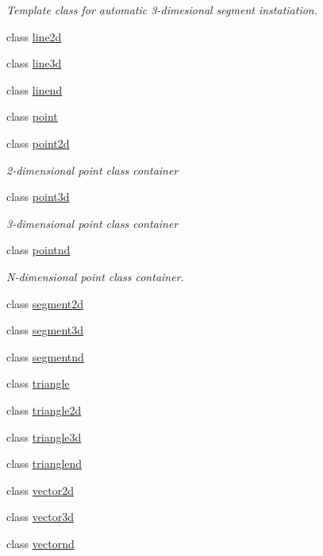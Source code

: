 \begin{DoxyCompactItemize}
\begin{DoxyCompactList}\small\item\em Template class for automatic 3-\/dimesional segment instatiation. \end{DoxyCompactList}\item 
class \hyperlink{classacme_1_1line2d}{line2d}
\item 
class \hyperlink{classacme_1_1line3d}{line3d}
\item 
class \hyperlink{classacme_1_1linend}{linend}
\item 
class \hyperlink{classacme_1_1point}{point}
\item 
class \hyperlink{classacme_1_1point2d}{point2d}
\begin{DoxyCompactList}\small\item\em 2-\/dimensional point class container \end{DoxyCompactList}\item 
class \hyperlink{classacme_1_1point3d}{point3d}
\begin{DoxyCompactList}\small\item\em 3-\/dimensional point class container \end{DoxyCompactList}\item 
class \hyperlink{classacme_1_1pointnd}{pointnd}
\begin{DoxyCompactList}\small\item\em N-\/dimensional point class container. \end{DoxyCompactList}\item 
class \hyperlink{classacme_1_1segment2d}{segment2d}
\item 
class \hyperlink{classacme_1_1segment3d}{segment3d}
\item 
class \hyperlink{classacme_1_1segmentnd}{segmentnd}
\item 
class \hyperlink{classacme_1_1triangle}{triangle}
\item 
class \hyperlink{classacme_1_1triangle2d}{triangle2d}
\item 
class \hyperlink{classacme_1_1triangle3d}{triangle3d}
\item 
class \hyperlink{classacme_1_1trianglend}{trianglend}
\item 
class \hyperlink{classacme_1_1vector2d}{vector2d}
\item 
class \hyperlink{classacme_1_1vector3d}{vector3d}
\item 
class \hyperlink{classacme_1_1vectornd}{vectornd}
\end{DoxyCompactItemize}
